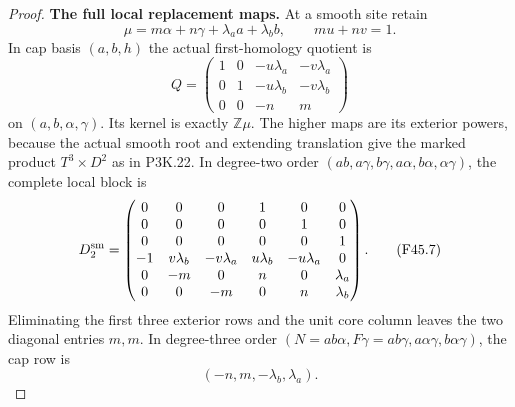 \begin{proof}
\par\medskip\noindent\textbf{The full local replacement maps.}\enspace
At a smooth site retain
\[
 \mu=m\alpha+n\gamma+\lambda_a a+\lambda_b b,
 \qquad mu+nv=1.
\]
In cap basis $(a,b,h)$ the actual first-homology quotient is
\[
 Q=\begin{pmatrix}
 1&0&-u\lambda_a&-v\lambda_a\\
 0&1&-u\lambda_b&-v\lambda_b\\
 0&0&-n&m
 \end{pmatrix}                                      \tag{F45.6}
\]
on $(a,b,\alpha,\gamma)$. Its kernel is exactly
$\mathbb Z\mu$. The higher maps are its exterior powers,
because the actual smooth root and extending translation give
the marked product $T^3\times D^2$ as in P3K.22.
In degree-two order
$(ab,a\gamma,b\gamma,a\alpha,b\alpha,\alpha\gamma)$,
the complete local block is
\[
 D_2^{\rm sm}=
 \begin{pmatrix}
 0&0&0&1&0&0\\0&0&0&0&1&0\\0&0&0&0&0&1\\
 -1&v\lambda_b&-v\lambda_a&u\lambda_b&-u\lambda_a&0\\
 0&-m&0&n&0&\lambda_a\\
 0&0&-m&0&n&\lambda_b
 \end{pmatrix}.                                    \tag{F45.7}
\]
Eliminating the first three exterior rows and the unit core
column leaves the two diagonal entries $m,m$.
In degree-three order
$(N=ab\alpha,F\gamma=ab\gamma,a\alpha\gamma,b\alpha\gamma)$,
the cap row is
\[
                    (-n,m,-\lambda_b,\lambda_a).     \tag{F45.8}
\]


\end{proof}
